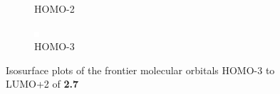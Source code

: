 \begin{figure}[!ht]
\begin{subfigure}[b]{0.31\textwidth}
  \caption{HOMO-2}
 \end{subfigure}
 \begin{subfigure}[b]{0.31\textwidth}
  \includegraphics[clip=true, width=\textwidth, keepaspectratio]{images/mos/7h-3.eps}
  \caption{HOMO-3}
 \end{subfigure}
\caption[Molecular orbitals HOMO-3 to LUMO+2 of \textbf{2.7}]{Isosurface plots of the frontier molecular orbitals HOMO-3 to LUMO+2 of \textbf{2.7}}
\label{fig.mo27}
\end{figure} 


